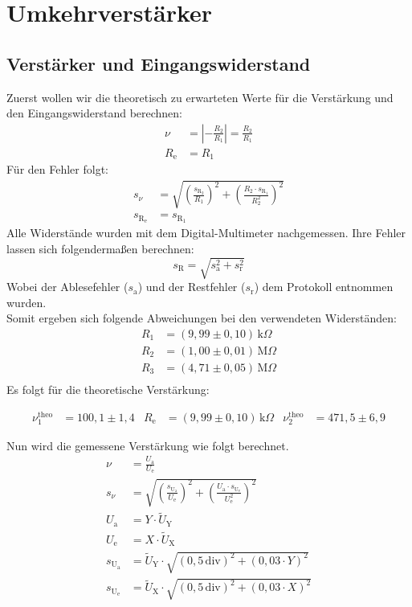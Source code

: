 \section{Umkehrverstärker}
\subsection{Verstärker und Eingangswiderstand}
Zuerst wollen wir die theoretisch zu erwarteten Werte für die Verstärkung und den Eingangswiderstand berechnen:
\begin{align}
    \nu&=\left|-\frac{R_2}{R_1}\right|=\frac{R_2}{R_1}\\
    R_\text{e}&=R_1
\end{align}
Für den Fehler folgt:
\begin{align}
    s_\nu&=\sqrt{\left(\frac{s_{\text{R}_2}}{R_1}\right)^2+\left(\frac{R_2\cdot s_{\text{R}_1}}{R_2^2}\right)^2}\\
    s_{\text{R}_\text{e}}&=s_{\text{R}_1}
\end{align}
Alle Widerstände wurden mit dem Digital-Multimeter nachgemessen.
Ihre Fehler lassen sich folgendermaßen berechnen:
\begin{equation}
    s_\text{R}=\sqrt{s_\text{a}^2+s_\text{r}^2}
\end{equation}
Wobei der Ablesefehler ($s_\text{a}$) und der Restfehler ($s_\text{r}$) dem Protokoll entnommen wurden.\\
Somit ergeben sich folgende Abweichungen bei den verwendeten Widerständen:
\begin{align}
    R_1&=\left(9,99\pm0,10\right)\,\text{k}\Omega\\
    R_2&=\left(1,00\pm0,01\right)\,\text{M}\Omega\\
    R_3&=\left(4,71\pm0,05\right)\,\text{M}\Omega\\
\end{align}
Es folgt für die theoretische Verstärkung:
\begin{framed}
    \begin{align}
        \nu_1^\text{theo}&=100,1\pm1,4& R_\text{e}&=\left(9,99\pm0,10\right)\,\text{k}\Omega &\nu_2^\text{theo}&=471,5\pm6,9
    \end{align}
\end{framed}\newpage
Nun wird die gemessene Verstärkung wie folgt berechnet.
\begin{align}
    \nu&=\frac{U_\text{a}}{U_\text{e}}\\
    s_\nu&=\sqrt{\left(\frac{s_{\text{U}_\text{a}}}{U_\text{e}}\right)^2+\left(\frac{U_\text{a}\cdot s_{\text{U}_\text{e}}}{U_\text{e}^2}\right)^2}\\
    U_\text{a}&=Y\cdot\tilde{U}_\text{Y}\\
    U_\text{e}&=X\cdot\tilde{U}_\text{X}\\
    s_{\text{U}_\text{a}}&=\tilde{U}_\text{Y}\cdot\sqrt{\left(0,5\,\text{div}\right)^2+\left(0,03\cdot Y\right)^2}\\
    s_{\text{U}_\text{e}}&=\tilde{U}_\text{X}\cdot\sqrt{\left(0,5\,\text{div}\right)^2+\left(0,03\cdot X\right)^2}
\end{align}
